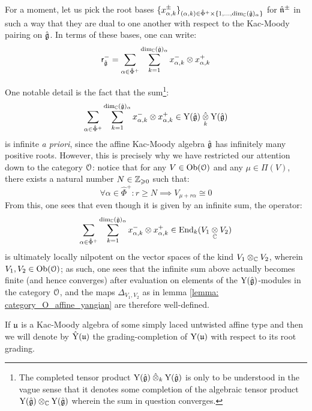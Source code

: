         \begin{remark}
            For a moment, let us pick the root bases $\{ x_{\alpha, k}^{\pm} \}_{(\alpha, k) \in \hat{\Phi}^+ \x \{1, ..., \dim_{\bbC} (\hat{\g})_{\alpha} \}}$ for $\hat{\mathfrak{n}}^{\pm}$ in such a way that they are dual to one another with respect to the Kac-Moody pairing on $\hat{\mathfrak{g}}$. In terms of these bases, one can write:
                $$\sfr_{\hat{\g}}^- = \sum_{\alpha \in \hat{\Phi}^+} \sum_{k = 1}^{ \dim_{\bbC} (\hat{\g})_{\alpha} } x_{\alpha, k}^- \tensor x_{\alpha, k}^+$$
        
            One notable detail is the fact that the sum\footnote{The completed tensor product $\rmY(\hat{\g}) \hattensor_k \rmY(\hat{\g})$ is only to be understood in the vague sense that it denotes some completion of the algebraic tensor product $\rmY(\hat{\g}) \tensor_{\bbC} \rmY(\hat{\g})$ wherein the sum in question converges.}:
                $$\sum_{\alpha \in \hat{\Phi}^+} \sum_{k = 1}^{ \dim_{\bbC} (\hat{\g})_{\alpha} } x_{\alpha, k}^- \tensor x_{\alpha, k}^+ \in \rmY(\hat{\g}) \hattensor_k \rmY(\hat{\g})$$
            is infinite \textit{a priori}, since the affine Kac-Moody algebra $\hat{\mathfrak{g}}$ has infinitely many positive roots. However, this is precisely why we have restricted our attention down to the category $\mathcal{O}$: notice that for any $V \in \mathrm{Ob}(\mathcal{O})$ and any $\mu \in \Pi(V)$, there exists a natural number $N \in \mathbb{Z}_{\geqslant 0}$ such that:
                $$\forall \alpha \in \hat{\Phi}^+: r \geq N \implies V_{\mu + r \alpha} \cong 0$$
            From this, one sees that even though it is given by an infinite sum, the operator:
                $$\sum_{\alpha \in \hat{\Phi}^+} \sum_{k = 1}^{ \dim_{\bbC} (\hat{\g})_{\alpha} } x_{\alpha, k}^- \tensor x_{\alpha, k}^+ \in \End_k(V_1 \tensor_{\bbC} V_2)$$
            is ultimately locally nilpotent on the vector spaces of the kind $V_1 \tensor_{\bbC} V_2$, wherein $V_1, V_2 \in \mathrm{Ob}(\mathcal{O})$; as such, one sees that the infinite sum above actually becomes finite (and hence converges) after evaluation on elements of the $\mathrm{Y}(\hat{\mathfrak{g}})$-modules in the category $\mathcal{O}$, and the maps $\Delta_{V_1, V_2}$ as in lemma \ref{lemma: category_O_affine_yangian} are therefore well-defined. 
        \end{remark}
        \begin{convention}
            If $\mathfrak{u}$ is a Kac-Moody algebra of some simply laced untwisted affine type and then we will denote by $\hat{\mathrm{Y}}(\mathfrak{u})$ the grading-completion of $\mathrm{Y}(\mathfrak{u})$ with respect to its root grading.
        \end{convention}
